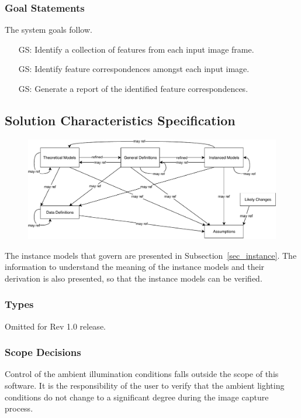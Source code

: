 \documentclass[12pt]{article}
\newcounter{goalnum} %
\begin{document}
\subsubsection{Goal Statements}
\noindent The system goals follow.

\begin{itemize}
  
  \item[GS\refstepcounter{goalnum}\thegoalnum \label{identify_features}:]
    Identify a collection of features from each input image frame. 
  \item[GS\refstepcounter{goalnum}\thegoalnum \label{identify_matches}:] 
    Identify feature correspondences amongst each input image.
  \item[GS\refstepcounter{goalnum}\thegoalnum \label{report_matches}:]
    Generate a report of the identified feature correspondences.
    
\end{itemize}

\subsection{Solution Characteristics Specification}
\begin{figure}[H]
  \includegraphics[scale=0.9]{RelationsBetweenTM_GD_IM_DD_A.pdf}
\end{figure}

The instance models that govern \progname{} are presented in
Subsection~\ref{sec_instance}.  The information to understand the meaning of the
instance models and their derivation is also presented, so that the instance
models can be verified.

\subsubsection{Types}
Omitted for Rev 1.0 release.

\subsubsection{Scope Decisions}
Control of the ambient illumination conditions falls outside the scope of this software.
It is the responsibility of the user to verify that the ambient lighting conditions do 
not change to a significant degree during the image capture process.
\end{document}
